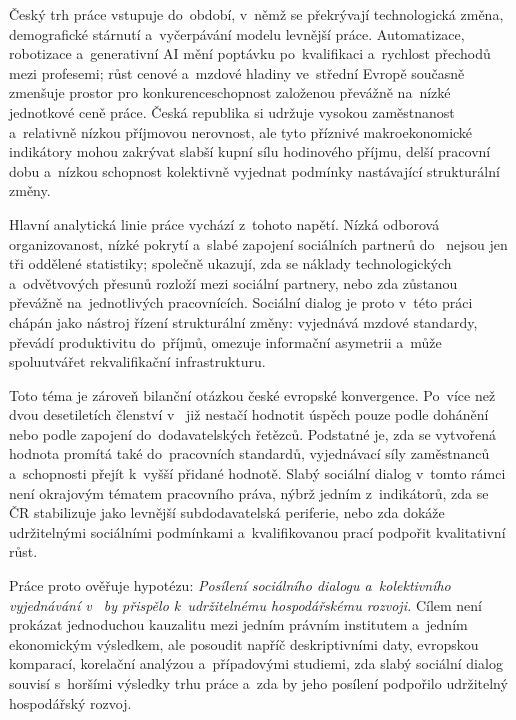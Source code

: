 
Český trh práce vstupuje do~období, v~němž se překrývají technologická změna, demografické stárnutí a~vyčerpávání modelu levnější práce.
Automatizace, robotizace a~generativní \acs{AI} mění poptávku po~kvalifikaci a~rychlost přechodů mezi profesemi; růst cenové a~mzdové hladiny ve~střední Evropě současně zmenšuje prostor pro konkurenceschopnost založenou převážně na~nízké jednotkové ceně práce.
Česká republika si udržuje vysokou zaměstnanost a~relativně nízkou příjmovou nerovnost, ale tyto příznivé makroekonomické indikátory mohou zakrývat slabší kupní sílu hodinového příjmu, delší pracovní dobu a~nízkou schopnost kolektivně vyjednat podmínky nastávající strukturální změny.\par

Hlavní analytická linie práce vychází z~tohoto napětí. Nízká odborová organizovanost, nízké pokrytí  a~slabé zapojení sociálních partnerů do~ nejsou jen tři oddělené statistiky; společně ukazují, zda se náklady technologických a~odvětvových přesunů rozloží mezi sociální partnery, nebo zda zůstanou převážně na~jednotlivých pracovnících. Sociální dialog je proto v~této práci chápán jako nástroj řízení strukturální změny: vyjednává mzdové standardy, převádí produktivitu do~příjmů, omezuje informační asymetrii a~může spoluutvářet rekvalifikační infrastrukturu.\par

Toto téma je zároveň bilanční otázkou české evropské konvergence. Po~více než dvou desetiletích členství v~ již nestačí hodnotit úspěch pouze podle dohánění  nebo podle zapojení do~dodavatelských řetězců. Podstatné je, zda se vytvořená hodnota promítá také do~pracovních standardů, vyjednávací síly zaměstnanců a~schopnosti přejít k~vyšší přidané hodnotě. Slabý sociální dialog v~tomto rámci není okrajovým tématem pracovního práva, nýbrž jedním z~indikátorů, zda se \acl{ČR} stabilizuje jako levnější subdodavatelská periferie, nebo zda dokáže udržitelnými sociálními podmínkami a~kvalifikovanou prací podpořit kvalitativní růst.\par

Práce proto ověřuje hypotézu: \emph{Posílení sociálního dialogu a~kolektivního vyjednávání v~ by přispělo k~udržitelnému hospodářskému rozvoji.} Cílem není prokázat jednoduchou kauzalitu mezi jedním právním institutem a~jedním ekonomickým výsledkem, ale posoudit napříč deskriptivními daty, evropskou komparací, korelační analýzou a~případovými studiemi, zda slabý sociální dialog souvisí s~horšími výsledky trhu práce a~zda by jeho posílení podpořilo udržitelný hospodářský rozvoj.\par


